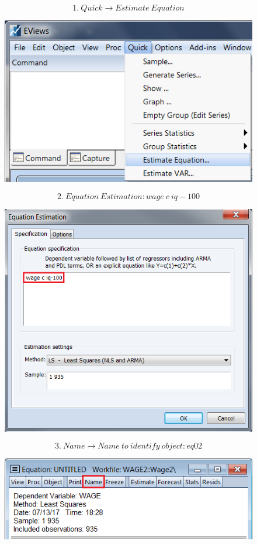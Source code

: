 \documentclass[12pt]{report}
\begin{document}
$$1.\ Quick \to Estimate\ Equation$$
\begin{figure}[H]
	\centering
	\includegraphics{q3_11}
\end{figure}
\vspace{-\baselineskip}
$$2.\ Equation\ Estimation: wage\ c\ iq-100$$
\begin{figure}[H]
	\centering
	\includegraphics{q3_22}
\end{figure}
\vspace{-\baselineskip}
$$3.\ Name \to Name\ to\ identify\ object: eq02$$
\begin{figure}[H]
	\centering
	\includegraphics{q3_23}
\end{figure}
\end{document}
